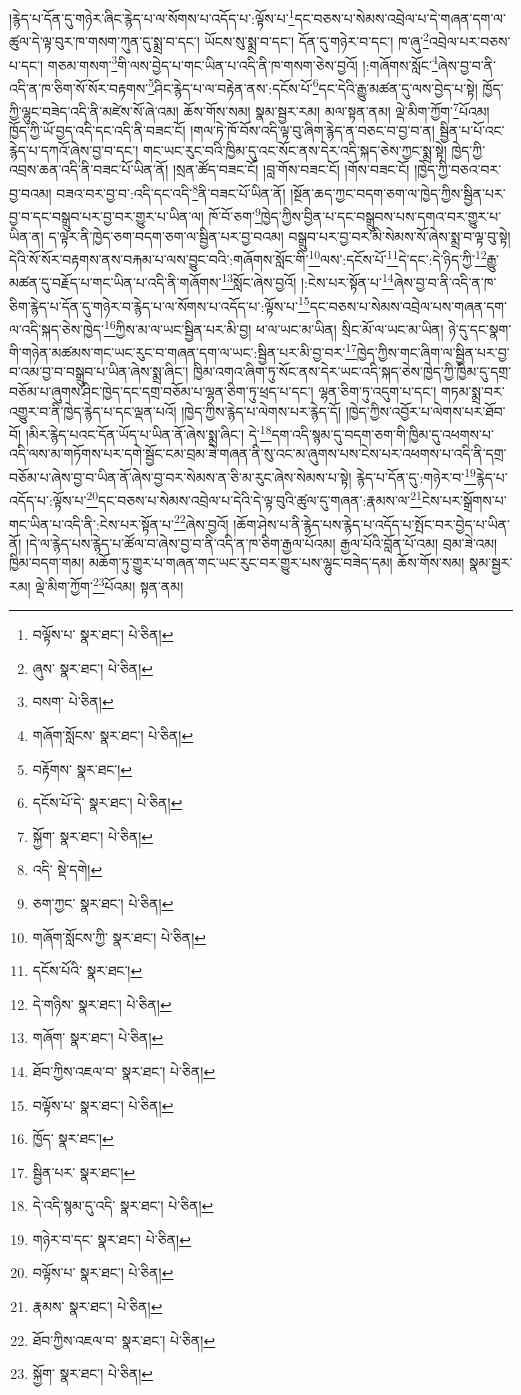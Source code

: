 །རྙེད་པ་དོན་དུ་གཉེར་ཞིང་རྙེད་པ་ལ་སོགས་པ་འདོད་པ་:ལྟོས་པ་\footnote{བལྟོས་པ་  སྣར་ཐང་།  པེ་ཅིན། }དང་བཅས་པ་སེམས་འབྲེལ་པ་དེ་གཞན་དག་ལ་ཚུལ་དེ་ལྟ་བུར་ཁ་གསག་ཀུན་དུ་སྨྲ་བ་དང་། ཡོངས་སུ་སྨྲ་བ་དང་། དོན་དུ་གཉེར་བ་དང་། ཁ་ཞུ་\footnote{ཞུས་  སྣར་ཐང་།  པེ་ཅིན། }འབྲེལ་པར་བཅས་པ་དང་། གཅམ་གསག་\footnote{བསག་  པེ་ཅིན། }གི་ལས་བྱེད་པ་གང་ཡིན་པ་འདི་ནི་ཁ་གསག་ཅེས་བྱའོ། །:གཞོགས་སློང་\footnote{གཞོག་སློངས་  སྣར་ཐང་།  པེ་ཅིན། }ཞེས་བྱ་བ་ནི་འདི་ན་ཁ་ཅིག་སོ་སོར་བརྟགས་\footnote{བརྟོགས་  སྣར་ཐང་། }ཤིང་རྙེད་པ་ལ་བརྟེན་ནས་:དངོས་པོ་\footnote{དངོས་པོ་དེ་  སྣར་ཐང་།  པེ་ཅིན། }དང་དེའི་རྒྱུ་མཚན་དུ་ལས་བྱེད་པ་སྟེ། ཁྱོད་ཀྱི་ལྷུང་བཟེད་འདི་ནི་མཛེས་སོ་ཞེ་འམ། ཆོས་གོས་སམ། སྣམ་སྦྱར་རམ། མལ་སྟན་ནམ། ལྡེ་མིག་ཀྱོག་\footnote{སྐྱོག་  སྣར་ཐང་།  པེ་ཅིན། }པོའམ། ཁྱོད་ཀྱི་ཡོ་བྱད་འདི་དང་འདི་ནི་བཟང་ངོ། །གལ་ཏེ་ཁོ་བོས་འདི་ལྟ་བུ་ཞིག་རྙེད་ན་བཅང་བ་བྱ་བ་ན། སྦྱིན་པ་པོ་འང་རྙེད་པ་དཀའོ་ཞེས་བྱ་བ་དང་། གང་ཡང་རུང་བའི་ཁྱིམ་དུ་འང་སོང་ནས་དེར་འདི་སྐད་ཅེས་ཀྱང་སྨྲ་སྟེ། ཁྱེད་ཀྱི་འབྲས་ཆན་འདི་ནི་བཟང་པོ་ཡིན་ནོ། །སྲན་ཚོད་བཟང་ངོ། །བླ་གོས་བཟང་ངོ། །གོས་བཟང་ངོ། །ཁྱེད་ཀྱི་བཅའ་བར་བྱ་བའམ། བཟའ་བར་བྱ་བ་:འདི་དང་འདི་\footnote{འདི་  སྡེ་དགེ། }ནི་བཟང་པོ་ཡིན་ནོ། །སྔོན་ཆད་ཀྱང་བདག་ཅག་ལ་ཁྱེད་ཀྱིས་སྦྱིན་པར་བྱ་བ་དང་བསྒྲུབ་པར་བྱ་བར་གྱུར་པ་ཡིན་ལ། ཁོ་བོ་ཅག་\footnote{ཅག་ཀྱང་  སྣར་ཐང་།  པེ་ཅིན། }ཁྱེད་ཀྱིས་བྱིན་པ་དང་བསྒྲུབས་པས་དགའ་བར་གྱུར་པ་ཡིན་ན། ད་ལྟར་ནི་ཁྱེད་ཅག་བདག་ཅག་ལ་སྦྱིན་པར་བྱ་བའམ། བསྒྲུབ་པར་བྱ་བར་མི་སེམས་སོ་ཞེས་སྨྲ་བ་ལྟ་བུ་སྟེ། དེའི་སོ་སོར་བརྟགས་ནས་བརྐམ་པ་ལས་བྱུང་བའི་:གཞོགས་སློང་གི་\footnote{གཞོག་སློངས་ཀྱི་  སྣར་ཐང་།  པེ་ཅིན། }ལས་:དངོས་པོ་\footnote{དངོས་པོའི་  སྣར་ཐང་། }དེ་དང་:དེ་ཉིད་ཀྱི་\footnote{དེ་གཉིས་  སྣར་ཐང་།  པེ་ཅིན། }རྒྱུ་མཚན་དུ་བརྗོད་པ་གང་ཡིན་པ་འདི་ནི་གཞོགས་\footnote{གཞོག་  སྣར་ཐང་།  པེ་ཅིན། }སློང་ཞེས་བྱའོ། །:ངེས་པར་སྟོན་པ་\footnote{ཐོབ་ཀྱིས་འཇལ་བ་  སྣར་ཐང་།  པེ་ཅིན། }ཞེས་བྱ་བ་ནི་འདི་ན་ཁ་ཅིག་རྙེད་པ་དོན་དུ་གཉེར་བ་རྙེད་པ་ལ་སོགས་པ་འདོད་པ་:ལྟོས་པ་\footnote{བལྟོས་པ་  སྣར་ཐང་།  པེ་ཅིན། }དང་བཅས་པ་སེམས་འབྲེལ་པས་གཞན་དག་ལ་འདི་སྐད་ཅེས་ཁྱེད་\footnote{ཁྱོད་  སྣར་ཐང་། }ཀྱིས་མ་ལ་ཡང་སྦྱིན་པར་མི་བྱ། ཕ་ལ་ཡང་མ་ཡིན། སྲིང་མོ་ལ་ཡང་མ་ཡིན། ཉེ་དུ་དང་སྣག་གི་གཉེན་མཚམས་གང་ཡང་རུང་བ་གཞན་དག་ལ་ཡང་:སྦྱིན་པར་མི་བྱ་བར་\footnote{སྦྱིན་པར་  སྣར་ཐང་། }ཁྱེད་ཀྱིས་གང་ཞིག་ལ་སྦྱིན་པར་བྱ་བ་འམ་བྱ་བ་བསྒྲུབ་པ་ཡིན་ཞེས་སྨྲ་ཞིང་། ཁྱིམ་འགའ་ཞིག་ཏུ་སོང་ནས་དེར་ཡང་འདི་སྐད་ཅེས་ཁྱེད་ཀྱི་ཁྱིམ་དུ་དགྲ་བཅོམ་པ་ཞུགས་ཤིང་ཁྱེད་དང་དགྲ་བཅོམ་པ་ལྷན་ཅིག་ཏུ་ཕྲད་པ་དང་། ལྷན་ཅིག་ཏུ་འདུག་པ་དང་། གཏམ་སྨྲ་བར་འགྱུར་བ་ནི་ཁྱེད་རྙེད་པ་དང་ལྡན་པའོ། །ཁྱེད་ཀྱིས་རྙེད་པ་ལེགས་པར་རྙེད་དོ། །ཁྱེད་ཀྱིས་འབྱོར་པ་ལེགས་པར་ཐོབ་བོ། །མིར་རྙེད་པའང་དོན་ཡོད་པ་ཡིན་ནོ་ཞེས་སྨྲ་ཞིང་། དེ་\footnote{དེ་འདི་སྙམ་དུ་འདི་  སྣར་ཐང་།  པེ་ཅིན། }དག་འདི་སྙམ་དུ་བདག་ཅག་གི་ཁྱིམ་དུ་འཕགས་པ་འདི་ལས་མ་གཏོགས་པར་དགེ་སྦྱོང་ངམ་བྲམ་ཟེ་གཞན་ནི་སུ་འང་མ་ཞུགས་པས་ངེས་པར་འཕགས་པ་འདི་ནི་དགྲ་བཅོམ་པ་ཞེས་བྱ་བ་ཡིན་ནོ་ཞེས་བྱ་བར་སེམས་ན་ཅི་མ་རུང་ཞེས་སེམས་པ་སྟེ། རྙེད་པ་དོན་དུ་:གཉེར་བ་\footnote{གཉེར་བ་དང་  སྣར་ཐང་།  པེ་ཅིན། }རྙེད་པ་འདོད་པ་:ལྟོས་པ་\footnote{བལྟོས་པ་  སྣར་ཐང་།  པེ་ཅིན། }དང་བཅས་པ་སེམས་འབྲེལ་པ་དེའི་དེ་ལྟ་བུའི་ཚུལ་དུ་གཞན་:རྣམས་ལ་\footnote{རྣམས་  སྣར་ཐང་།  པེ་ཅིན། }ངེས་པར་སྒྲོགས་པ་གང་ཡིན་པ་འདི་ནི་:ངེས་པར་སྟོན་པ་\footnote{ཐོབ་ཀྱིས་འཇལ་བ་  སྣར་ཐང་།  པེ་ཅིན། }ཞེས་བྱའོ། །ཆོག་ཤེས་པ་ནི་རྙེད་པས་རྙེད་པ་འདོད་པ་སྤོང་བར་བྱེད་པ་ཡིན་ནོ། །དེ་ལ་རྙེད་པས་རྙེད་པ་ཚོལ་བ་ཞེས་བྱ་བ་ནི་འདི་ན་ཁ་ཅིག་རྒྱལ་པོའམ། རྒྱལ་པོའི་བློན་པོ་འམ། བྲམ་ཟེ་འམ། ཁྱིམ་བདག་གམ། མཆོག་ཏུ་གྱུར་པ་གཞན་གང་ཡང་རུང་བར་གྱུར་པས་ལྷུང་བཟེད་དམ། ཆོས་གོས་སམ། སྣམ་སྦྱར་རམ། ལྡེ་མིག་ཀྱོག་\footnote{སྐྱོག་  སྣར་ཐང་།  པེ་ཅིན། }པོའམ། སྟན་ནམ། 